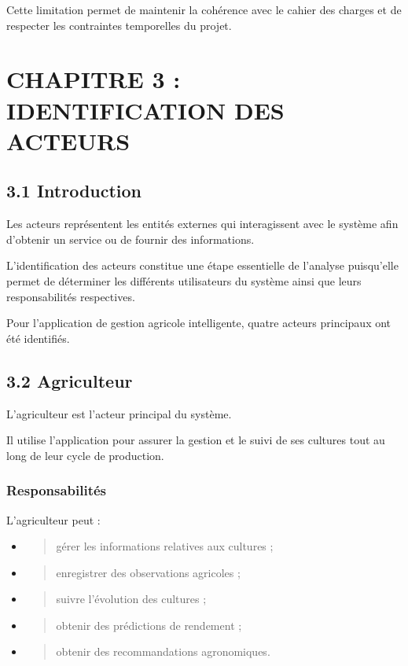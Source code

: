 \documentclass[
]{article}
\begin{document}
Cette limitation permet de maintenir la cohérence avec le cahier des
charges et de respecter les contraintes temporelles du projet.

\hypertarget{chapitre-3-identification-des-acteurs}{%
\section{CHAPITRE 3 : IDENTIFICATION DES
ACTEURS}\label{chapitre-3-identification-des-acteurs}}

\hypertarget{introduction}{%
\subsection{3.1 Introduction}\label{introduction}}

Les acteurs représentent les entités externes qui interagissent avec le
système afin d'obtenir un service ou de fournir des informations.

L'identification des acteurs constitue une étape essentielle de
l'analyse puisqu'elle permet de déterminer les différents utilisateurs
du système ainsi que leurs responsabilités respectives.

Pour l'application de gestion agricole intelligente, quatre acteurs
principaux ont été identifiés.

\hypertarget{agriculteur}{%
\subsection{3.2 Agriculteur}\label{agriculteur}}

L'agriculteur est l'acteur principal du système.

Il utilise l'application pour assurer la gestion et le suivi de ses
cultures tout au long de leur cycle de production.

\hypertarget{responsabilituxe9s}{%
\subsubsection{Responsabilités}\label{responsabilituxe9s}}

L'agriculteur peut :

\begin{itemize}
\item
  \begin{quote}
  gérer les informations relatives aux cultures ;
  \end{quote}
\item
  \begin{quote}
  enregistrer des observations agricoles ;
  \end{quote}
\item
  \begin{quote}
  suivre l'évolution des cultures ;
  \end{quote}
\item
  \begin{quote}
  obtenir des prédictions de rendement ;
  \end{quote}
\item
  \begin{quote}
  obtenir des recommandations agronomiques.
  \end{quote}
\end{itemize}
\end{document}
